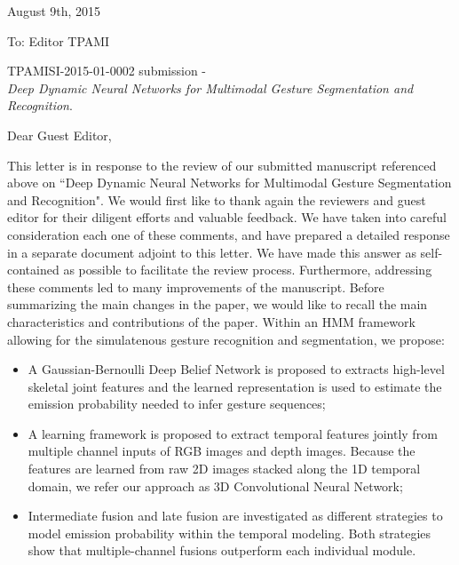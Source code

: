 \documentclass[12pt]{article}
\begin{document}
\begin{center}
\end{center}

\newcommand{\rev}[1]{{\noindent {\bf Comment:} {\it #1}}~\\}
\newcommand{\ans}[1]{{\noindent {\bf Response:} #1}~\\}


\begin{flushleft}
August 9th, 2015
\end{flushleft}

\vspace*{3mm}

\begin{flushleft}
To: Editor TPAMI
\end{flushleft}

\begin{flushleft}
TPAMISI-2015-01-0002 submission - \\
{\em Deep Dynamic Neural Networks for Multimodal Gesture Segmentation and Recognition}.
\end{flushleft}

\vspace*{3mm}

\pagestyle{empty}

\noindent Dear Guest Editor,
\newline



This letter is in response to the review of our submitted manuscript referenced above on
``Deep Dynamic Neural Networks for Multimodal Gesture Segmentation and Recognition".
%
We would first like to thank again the reviewers and guest editor for their diligent efforts and valuable feedback.
We have taken into careful consideration each one of these comments, and have prepared a detailed response
in a separate document adjoint to this letter.
We have made this answer as self-contained as possible to facilitate the review process.
%
Furthermore, addressing these comments led to many improvements of the manuscript.
%
Before summarizing the main changes in the paper, we would like to recall the main characteristics and
contributions of the paper. Within an HMM framework allowing for the simulatenous gesture recognition and segmentation, we propose:
\begin{itemize}
\item A Gaussian-Bernoulli Deep Belief Network is proposed to extracts high-level skeletal joint features and the learned representation is used to estimate the emission probability needed to infer gesture sequences;
\item A learning framework is proposed to extract temporal features jointly from multiple channel inputs of RGB images and depth images. Because the features are learned from raw 2D images stacked along the 1D temporal domain, we refer our approach as 3D Convolutional Neural Network;
\item Intermediate fusion and late fusion are investigated as different strategies to model emission probability within the temporal modeling. Both strategies show that multiple-channel fusions outperform each individual module.
\end{itemize}
\end{document}
